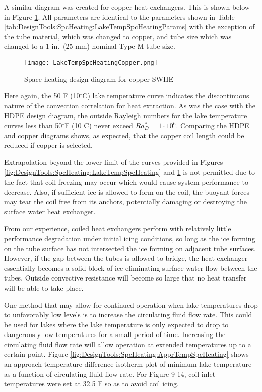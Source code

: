 A similar diagram was created for copper heat exchangers. This is shown below in Figure \ref{fig:DesignTools:SpcHeating:LakeTempSpcHeatingCopper}. All parameters are identical to the parameters shown in Table \ref{tab:DesignTools:SpcHeating:LakeTempSpcHeatingParams} with the exception of the tube material, which was changed to copper, and tube size which was changed to a 1 in.\ (25 mm) nominal Type M tube size.
	
	\begin{figure}
		\centering
		\texttt{[image: LakeTempSpcHeatingCopper.png]}
		\caption{Space heating design diagram for copper SWHE}
		\label{fig:DesignTools:SpcHeating:LakeTempSpcHeatingCopper}
	\end{figure}
	
Here again, the 50$^\circ$F (10$^\circ$C) lake temperature curve indicates the discontinuous nature of the convection correlation for heat extraction. As was the case with the HDPE design diagram, the outside Rayleigh numbers for the lake temperature curves less than 50$^\circ$F (10$^\circ$C)  never exceed $Ra_D^* = 1 \cdot 10^6$. Comparing the HDPE and copper diagrams shows, as expected, that the copper coil length could be reduced if copper is selected. 
	
Extrapolation beyond the lower limit of the curves provided in Figures \ref{fig:DesignTools:SpcHeating:LakeTempSpcHeating} and \ref{fig:DesignTools:SpcHeating:LakeTempSpcHeatingCopper} is not permitted due to the fact that coil freezing may occur which would cause system performance to decrease. Also, if sufficient ice is allowed to form on the coil, the buoyant forces may tear the coil free from its anchors, potentially damaging or destroying the surface water heat exchanger.

From our experience, coiled heat exchangers perform with relatively little performance degradation under initial icing conditions, so long as the ice forming on the tube surface has not intersected the ice forming on adjacent tube surfaces. However, if the gap between the tubes is allowed to bridge, the heat exchanger essentially becomes a solid block of ice eliminating surface water flow between the tubes. Outside convective resistance will become so large that no heat transfer will be able to take place.

One method that may allow for continued operation when lake temperatures drop to unfavorably low levels is to increase the circulating fluid flow rate. This could be used for lakes where the lake temperature is only expected to drop to dangerously low temperatures for a small period of time. Increasing the circulating fluid flow rate will allow operation at extended temperatures up to a certain point. Figure \ref{fig:DesignTools:SpcHeating:ApprTempSpcHeating} shows an approach temperature difference isotherm plot of minimum lake temperature as a function of circulating fluid flow rate. For Figure 9-14, coil inlet temperatures were set at 32.5$^\circ$F so as to avoid coil icing.


